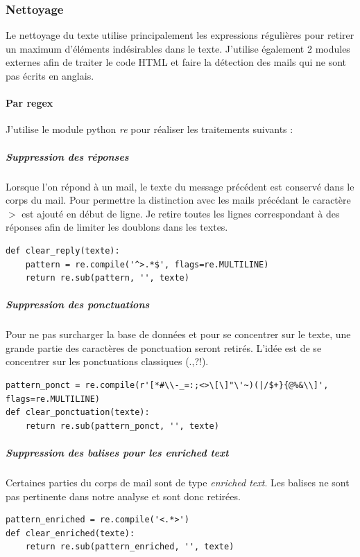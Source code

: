 	\subsubsection{Nettoyage}
		Le nettoyage du texte utilise principalement les expressions régulières pour retirer un maximum d'éléments indésirables dans le texte.
        J'utilise également 2 modules externes afin de traiter le code HTML et faire la détection des mails qui ne sont pas écrits en anglais.

		\paragraph{Par regex}
			J'utilise le module python \emph{re} pour réaliser les traitements suivants :
			\subparagraph{Suppression des réponses}
				Lorsque l'on répond à un mail, le texte du message précédent est conservé dans le corps du mail.
                Pour permettre la distinction avec les mails précédant le caractère $>$ est ajouté en début de ligne.
                Je retire toutes les lignes correspondant à des réponses afin de limiter les doublons dans les textes.

			\begin{lstlisting}[title=Nettoyage des réponses,label={lst:clear_resp}]
def clear_reply(texte):
    pattern = re.compile('^>.*$', flags=re.MULTILINE)
    return re.sub(pattern, '', texte)
            \end{lstlisting}

			\subparagraph{Suppression des ponctuations}
				Pour ne pas surcharger la base de données et pour se concentrer sur le texte, une grande partie des caractères de ponctuation seront retirés.
                L'idée est de se concentrer sur les ponctuations classiques (.,?!).

				\begin{lstlisting}[title=Nettoyage des ponctuations,label={lst:clear_ponct}]
pattern_ponct = re.compile(r'[*#\\-_=:;<>\[\]"\'~)(|/$+}{@%&\\]', flags=re.MULTILINE)
def clear_ponctuation(texte):
    return re.sub(pattern_ponct, '', texte)
                \end{lstlisting}

			\subparagraph{Suppression des balises pour les enriched text}
				Certaines parties du corps de mail sont de type \emph{enriched text}.
				Les balises ne sont pas pertinente dans notre analyse et sont donc retirées.

				\begin{lstlisting}[title=Nettoyage des balises enriched text,label={lst:clear_enriched}]
pattern_enriched = re.compile('<.*>')
def clear_enriched(texte):
    return re.sub(pattern_enriched, '', texte)
                \end{lstlisting}

